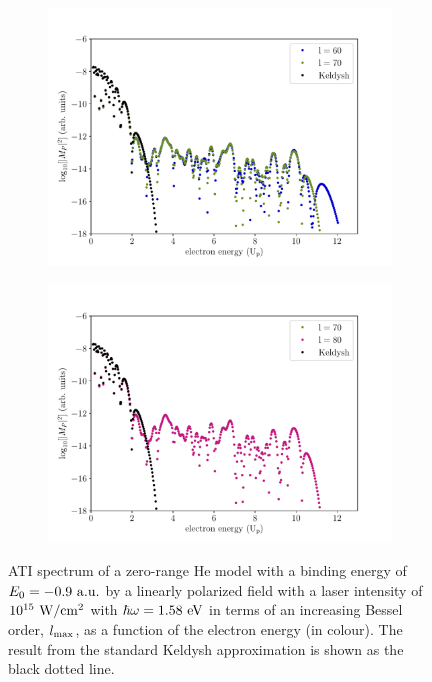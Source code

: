 \begin{figure}
\begin{subfigure}[b]{0.5\linewidth}
  \includegraphics[width=\textwidth]{figures/ch_ATI_SFA/He/l6070n512WP40PG25MR35vsKeldysh.pdf}
\end{subfigure}
\begin{subfigure}[b]{0.5\linewidth}
  \includegraphics[width=\textwidth]{figures/ch_ATI_SFA/He/l7080n512WP40PG25MR35vsKeldysh.pdf}
\end{subfigure}
\caption{ATI spectrum of a zero-range He model with a binding energy
  of $E_{0} = -0.9\ \rm{a.u.}$ by a linearly polarized field with a
  laser intensity of $10^{15}\ \rm{W/cm^{2}}$ with $\hbar\omega =
  1.58\ \rm{eV}$ in terms of an increasing Bessel order,
  $l_{\rm{max}}$, as a function of the electron energy (in
  colour). The result from the standard Keldysh approximation is shown
  as the black dotted line.}
  \label{fig:mp_convergence}
\end{figure}


